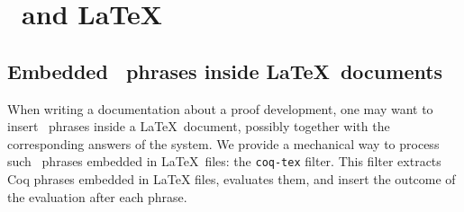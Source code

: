 




\section{\Coq\ and \LaTeX}\label{Latex}

\subsection{Embedded \Coq\ phrases inside \LaTeX\ documents}

When writing a documentation about a proof development, one may want
to insert \Coq\ phrases inside a \LaTeX\ document, possibly together with
the corresponding answers of the system. We provide a
mechanical way to process such \Coq\ phrases embedded in \LaTeX\ files: the
{\tt coq-tex} filter.  This filter extracts Coq phrases embedded in
LaTeX files, evaluates them, and insert the outcome of the evaluation
after each phrase.

